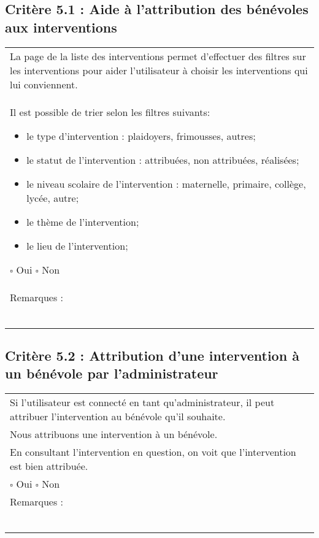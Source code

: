 	\subsection*{Critère 5.1 : Aide à l'attribution des bénévoles aux interventions }
  		\begin{center}
    	 		\begin{tabular}[h]{|p{}|}
			\hline
				La page de la liste des interventions permet d'effectuer des filtres sur les interventions pour aider l'utilisateur à choisir les interventions qui lui conviennent.\\
				Il est possible de trier selon les filtres suivants: 
				\begin{itemize}
				\item le type d'intervention : plaidoyers, frimousses, autres;
				\item le statut de l'intervention : attribuées, non attribuées, réalisées;
				\item le niveau scolaire de l'intervention : maternelle, primaire, collège, lycée, autre;
				\item le thème de l'intervention;
				\item le lieu de l'intervention; 
				\end{itemize}
				
				$\square$ Oui  \hfill \hfill $\square$ Non \\\hline Remarques : \\ ~\\
			 \\\hline
     		\end{tabular}
  		\end{center}	
  		
  	\subsection*{Critère 5.2 : Attribution d'une intervention à un bénévole par l'administrateur}
  		\begin{center}
    	 		\begin{tabular}[h]{|p{}|}
			\hline
				Si l'utilisateur est connecté en tant qu'administrateur, il peut attribuer l'intervention au bénévole qu'il souhaite. \\
				Nous attribuons une intervention à un bénévole. \\
				En consultant l'intervention en question, on voit que l'intervention est bien attribuée. \\
				
				$\square$ Oui  \hfill \hfill $\square$ Non \\\hline Remarques : \\ ~\\
			 \\\hline
     		\end{tabular}
  		\end{center}	
  		
